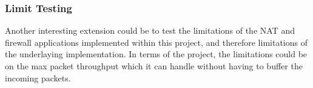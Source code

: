 \documentclass[interim_report.tex]{subfiles}
\begin{document}
\subsubsection{Limit Testing}
Another interesting extension could be to test the limitations of the NAT and firewall applications implemented within this project, and therefore limitations of the underlaying implementation. In terms of the project, the limitations could be on the max packet throughput which it can handle without having to buffer the incoming packets.
\end{document}
